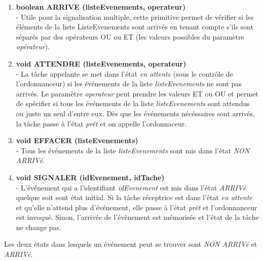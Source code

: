 {
\begin{enumerate}
   \item \textbf{boolean ARRIVE (listeEvenements, operateur)}
	~\\ - Utile pour la signalisation multiple, cette primitive permet de
	vérifier si les éléments de la liste ListeEvenements sont arrivés en tenant
	compte s'ils sont séparés par des opérateurs OU ou ET (les valeurs possibles
	du paramètre \textit{opérateur}).
   \item \textbf{void ATTENDRE (listeEvenements, operateur)}
	~\\ - La tâche appelante se met dans l'état \textit{en attente}
	 (sous le contrôle de l'ordonnanceur) si les événements de la liste
	 \textit{listeEvenements} ne sont pas arrivés. 
	 Le paramètre \textit{operateur} peut prendre les valeurs ET ou OU et 
	 permet de spécifier si tous les événements de la liste
	 \textit{listeEvenements} sont attendus ou juste un seul d'entre eux. 
	 Dès que les événements nécéssaires sont arrivés, la tâche passe à l'état
	 \textit{prêt} et on appelle l'ordonnaceur.
   \item \textbf{void EFFACER (listeEvenements)}
	~\\ - Tous les événements de la liste \textit{listeEvenements} sont
		mis dans l'état \textit{NON ARRIVé}.
	\item \textbf{void SIGNALER (idEvenement, idTache)}
	~\\ - L'événement qui a l'identifiant \textit{idEvenement} est mis dans l'état
	\textit{ARRIVé} quelque soit sont état initial. 
	Si la tâche réceptrice est dans l'état \textit{en attente} et qu'elle n'attend
	plus d'événement, elle passe à l'état \textit{prêt} et l'ordonnanceur est invoqué. 
	Sinon, l'arrivée de l'évènement est mémorisée et l'état de la tâche ne change pas.
\end{enumerate}
}
{
Les deux états dans lesquels un événement peut se trouver sont \textit{NON
ARRIVé} et \textit{ARRIVé}.

\begin{figure} [htp]
\centering
\end{figure}
}
